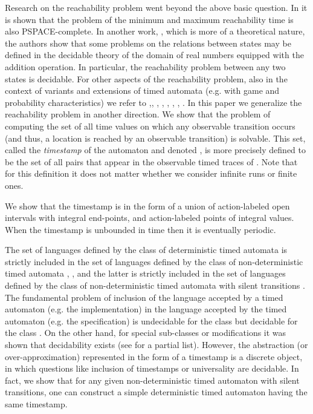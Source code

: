 \documentclass[11pt]{amsart}
\theoremstyle{definition}
\begin{document}
Research on the reachability problem went beyond the above basic question.
In \cite{CY92} it is shown that the problem of the minimum and maximum reachability time is also PSPACE-complete.
In another work, \cite{CJ99}, which is more of a theoretical nature, the authors show that some problems on the relations between states may be defined in the decidable theory of the domain of real numbers equipped with the addition operation.
In particular, the reachability problem between any two states is decidable.
For other aspects of the reachability problem, also in the context of variants and extensions of timed automata (e.g. with game and probability characteristics) we refer to \cite{CY92},\cite{member-ta-ha}, \cite{TY01},  \cite{WZP03}, \cite{control_ta}, \cite{HP06}, \cite{CHKM11}, \cite{HOW12}.
In this paper we generalize the reachability problem in another direction.
We show that the problem of computing the set of all time values on which any observable transition occurs (and thus, a location is reached by an observable transition) is solvable.
This set, called the \emph{timestamp} of the automaton  and denoted , is more precisely defined to be the set of all pairs  that appear in the observable timed traces of .
Note that for this definition it does not matter whether we consider infinite runs or finite ones.

We show that the timestamp is in the form of a union of action-labeled open intervals with integral end-points, and action-labeled points of integral values.
When the timestamp is unbounded in time then it is eventually periodic.
 
The set of languages defined by the class  of deterministic timed automata is strictly included in the set of languages defined by the class  of non-deterministic timed automata \cite{ta}, \cite{Finkel06}, and the latter is strictly included in the set of languages defined by the class  of non-deterministic timed automata with silent transitions \cite{ta-eps}.
The fundamental problem of inclusion of the language accepted by a timed automaton  (e.g. the implementation) in the language accepted by the timed automaton  (e.g. the specification) is undecidable for the class  but decidable for the class .
On the other hand, for special sub-classes or modifications it was shown that decidability exists (see \cite{bbbb,ta-eps,era,updatable-ta,Ouak_one_clk,Ouak_time_bound,bounded-time,Dec_TA_Survey,bound-det} for a partial list).
However, the abstraction (or over-approximation) represented in the form of a timestamp is a discrete object, in which questions like inclusion of timestamps or universality are decidable.
In fact, we show that for any given non-deterministic timed automaton with silent transitions, one can construct a simple deterministic timed automaton having the same timestamp. 
\end{document}
